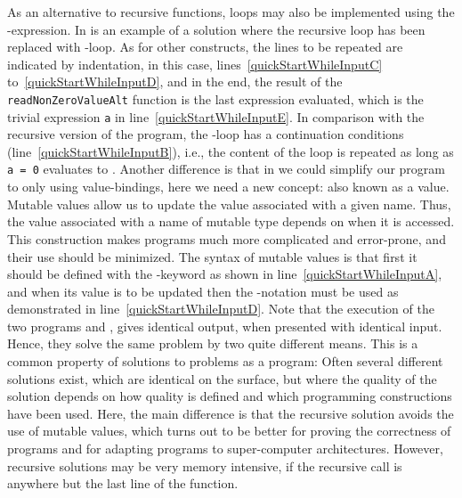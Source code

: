 \documentclass[fsharpNotes.tex]{subfiles}
\begin{document}
As an alternative to recursive functions, loops may also be implemented using the -expression. In  is an example of a solution where the recursive loop has been replaced with -loop.
% 
%
As for other constructs, the lines to be repeated are indicated by indentation, in this case, lines~\ref{quickStartWhileInputC} to~\ref{quickStartWhileInputD}, and in the end, the result of the
\lstinline{readNonZeroValueAlt} function is the last expression evaluated, which is the trivial expression \lstinline{a} in line~\ref{quickStartWhileInputE}. In comparison with the recursive version of the program, the -loop has a continuation conditions (line~\ref{quickStartWhileInputB}), i.e., the content of the loop is repeated as long as \lstinline{a = 0} evaluates to . Another difference is that in  we could simplify our program to only using  value-bindings, here we need a new concept:  also known as a  value. Mutable values allow us to update the value associated with a given name. Thus, the value associated with a name of mutable type depends on when it is accessed. This construction makes programs much more complicated and error-prone, and their use should be minimized. The syntax of mutable values is that first it should be defined with the -keyword as shown in line~\ref{quickStartWhileInputA}, and when its value is to be updated then the \lexeme{<-}-notation must be used as demonstrated in line~\ref{quickStartWhileInputD}. Note that the execution of the two programs  and , gives identical output, when presented with identical input. Hence, they solve the same problem by two quite different means. This is a common property of solutions to problems as a program: Often several different solutions exist, which are identical on the surface, but where the quality of the solution depends on how quality is defined and which programming constructions have been used. Here, the main difference is that the recursive solution avoids the use of mutable values, which turns out to be better for proving the correctness of programs and for adapting programs to super-computer architectures. However, recursive solutions may be very memory intensive, if the recursive call is anywhere but the last line of the function. 
\end{document}
